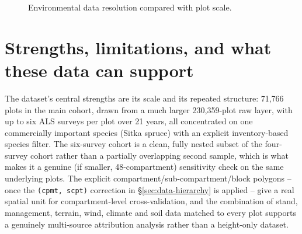 \begin{figure}[!htbp]
\centering
{}
\caption{Environmental data resolution compared with plot scale.}
\label{fig:data-resolution}
\end{figure}

\section{Strengths, limitations, and what these data can support}
\label{sec:data-strengths-limitations}

The dataset's central strengths are its scale and its repeated structure: 71,766 plots in the main
cohort, drawn from a much larger 230,359-plot raw layer, with up to six ALS surveys per plot over
21 years, all concentrated on one commercially important species (Sitka spruce) with an explicit
inventory-based species filter. The six-survey cohort is a clean, fully nested subset of the
four-survey cohort rather than a partially overlapping second sample, which is what makes it a
genuine (if smaller, 48-compartment) sensitivity check on the same underlying plots. The explicit
compartment/sub-compartment/block polygons -- once the \texttt{(cpmt, scpt)} correction in
\S\ref{sec:data-hierarchy} is applied -- give a real spatial unit for compartment-level
cross-validation, and the combination of stand, management, terrain, wind, climate and soil data
matched to every plot supports a genuinely multi-source attribution analysis rather than a
height-only dataset.

